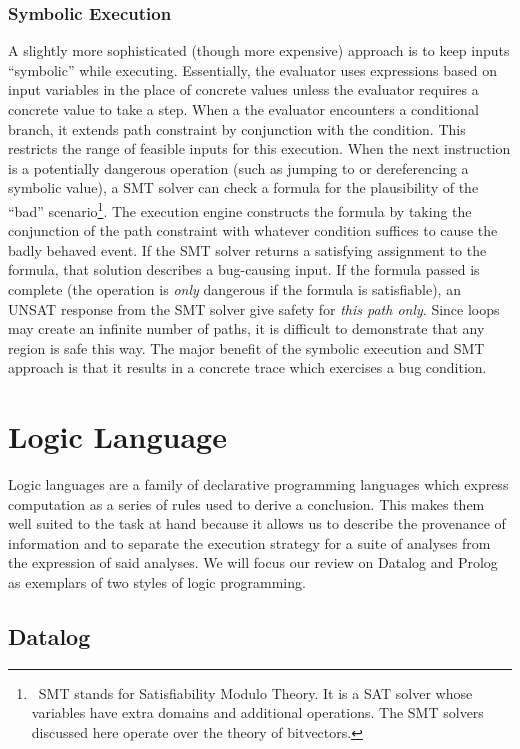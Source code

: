 \subsubsection{Symbolic Execution}
A slightly more sophisticated (though more expensive) approach is to keep inputs ``symbolic'' while executing.
Essentially, the evaluator uses expressions based on input variables in the place of concrete values unless the evaluator requires a concrete value to take a step.
When a the evaluator encounters a conditional branch, it extends path constraint by conjunction with the condition.
This restricts the range of feasible inputs for this execution.
When the next instruction is a potentially dangerous operation (such as jumping to or dereferencing a symbolic value), a SMT solver can check a formula for the plausibility of the ``bad'' scenario\footnote{\
  SMT stands for Satisfiability Modulo Theory.
  It is a SAT solver whose variables have extra domains and additional operations.
  The SMT solvers discussed here operate over the theory of bitvectors.
}.
The execution engine constructs the formula by taking the conjunction of the path constraint with whatever condition suffices to cause the badly behaved event.
If the SMT solver returns a satisfying assignment to the formula, that solution describes a bug-causing input\cite{aeg,mayhem}.
If the formula passed is complete (the operation is \emph{only} dangerous if the formula is satisfiable), an UNSAT response from the SMT solver give safety for \emph{this path only}.
Since loops may create an infinite number of paths, it is difficult to demonstrate that any region is safe this way.
The major benefit of the symbolic execution and SMT approach is that it results in a concrete trace which exercises a bug condition.

\section{Logic Language}
Logic languages are a family of declarative programming languages which express computation as a series of rules used to derive a conclusion.
This makes them well suited to the task at hand because it allows us to describe the provenance of information and to separate the execution strategy for a suite of analyses from the expression of said analyses.
We will focus our review on Datalog and Prolog as exemplars of two styles of logic programming.
\subsection{Datalog}
\label{sec:fchain}
